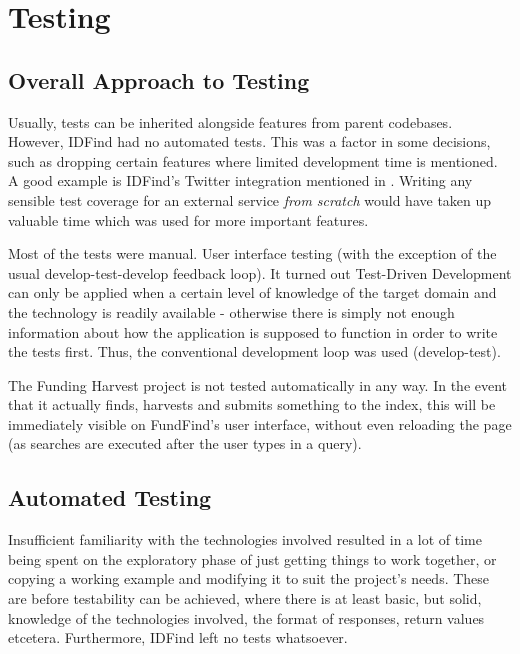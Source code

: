 \chapter{Testing}



\section{Overall Approach to Testing}
\label{testing-intro}
Usually, tests can be inherited alongside features from parent codebases. However, IDFind had no automated tests. This was a factor in some decisions, such as dropping certain features where limited development time is mentioned. A good example is IDFind's Twitter integration mentioned in . Writing any sensible test coverage for an external service \emph{from scratch} would have taken up valuable time which was used for more important features.

Most of the tests were manual. User interface testing (with the exception of the usual develop-test-develop feedback loop). It turned out Test-Driven Development can only be applied when a certain level of knowledge of the target domain and the technology is readily available - otherwise there is simply not enough information about how the application is supposed to function in order to write the tests first. Thus, the conventional development loop was used (develop-test).

The Funding Harvest project is not tested automatically in any way. In the event that it actually finds, harvests and submits something to the index, this will be immediately visible on FundFind's user interface, without even reloading the page (as searches are executed after the user types in a query).

\section{Automated Testing}
Insufficient familiarity with the technologies involved resulted in a lot of time being spent on the exploratory phase of just getting things to work together, or copying a working example and modifying it to suit the project's needs. These are before testability can be achieved, where there is at least basic, but solid, knowledge of the technologies involved, the format of responses, return values etcetera. Furthermore, IDFind left no tests whatsoever.

